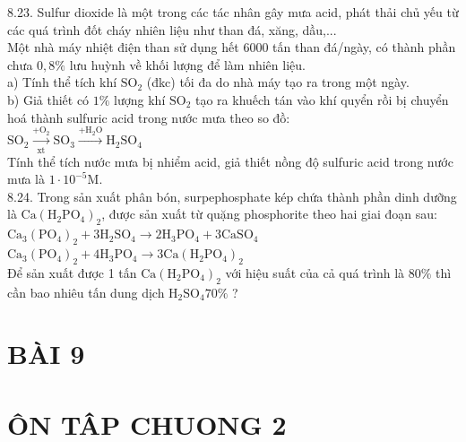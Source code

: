 \documentclass[10pt]{article}
\begin{document}
8.23. Sulfur dioxide là một trong các tác nhân gây mưa acid, phát thải chủ yếu từ các quá trình đốt cháy nhiên liệu như than đá, xăng, dầu,...\\
Một nhà máy nhiệt điện than sử dụng hết 6000 tấn than đá/ngày, có thành phần chưa $0,8 \%$ lưu huỳnh về khối lượng để làm nhiên liệu.\\
a) Tính thể tích khí $\mathrm{SO}_{2}$ (đkc) tối đa do nhà máy tạo ra trong một ngày.\\
b) Giả thiết có $1 \%$ lượng khí $\mathrm{SO}_{2}$ tạo ra khuếch tán vào khí quyển rồi bị chuyển hoá thành sulfuric acid trong nước mưa theo so đồ:\\
$\mathrm{SO}_{2} \xrightarrow[\text { xt }]{+\mathrm{O}_{2}} \mathrm{SO}_{3} \xrightarrow{+\mathrm{H}_{2} \mathrm{O}} \mathrm{H}_{2} \mathrm{SO}_{4}$\\
Tính thể tích nước mưa bị nhiểm acid, giả thiết nồng độ sulfuric acid trong nước mưa là $1 \cdot 10^{-5} \mathrm{M}$.\\
8.24. Trong sản xuất phân bón, surpephosphate kép chứa thành phần dinh dưỡng là $\mathrm{Ca}\left(\mathrm{H}_{2} \mathrm{PO}_{4}\right)_{2}$, được sản xuất từ quặng phosphorite theo hai giai đoạn sau:\\
$\mathrm{Ca}_{3}\left(\mathrm{PO}_{4}\right)_{2}+3 \mathrm{H}_{2} \mathrm{SO}_{4} \longrightarrow 2 \mathrm{H}_{3} \mathrm{PO}_{4}+3 \mathrm{CaSO}_{4}$\\
$\mathrm{Ca}_{3}\left(\mathrm{PO}_{4}\right)_{2}+4 \mathrm{H}_{3} \mathrm{PO}_{4} \longrightarrow 3 \mathrm{Ca}\left(\mathrm{H}_{2} \mathrm{PO}_{4}\right)_{2}$\\
Để sản xuất được 1 tấn $\mathrm{Ca}\left(\mathrm{H}_{2} \mathrm{PO}_{4}\right)_{2}$ với hiệu suất của cả quá trình là $80 \%$ thì cần bao nhiêu tấn dung dịch $\mathrm{H}_{2} \mathrm{SO}_{4} 70 \%$ ?

\section*{BÀI 9}
\section*{ÔN TÂP CHUONG 2}
\end{document}
